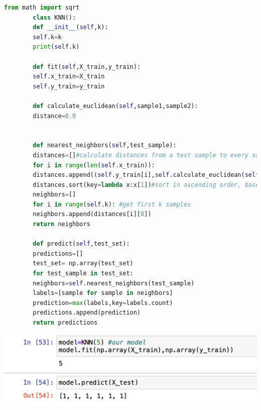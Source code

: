 \documentclass{article}
\begin{document}
	\begin{lstlisting}[language=Python]
		from math import sqrt
		class KNN():
		def __init__(self,k):
		self.k=k
		print(self.k)
		
		def fit(self,X_train,y_train):
		self.x_train=X_train
		self.y_train=y_train
		
		def calculate_euclidean(self,sample1,sample2):
		distance=0.0
	
		
		def nearest_neighbors(self,test_sample):
		distances=[]#calculate distances from a test sample to every sample in a training set
		for i in range(len(self.x_train)):
		distances.append((self.y_train[i],self.calculate_euclidean(self.x_train[i],test_sample)))
		distances.sort(key=lambda x:x[1])#sort in ascending order, based on a distance value
		neighbors=[]
		for i in range(self.k): #get first k samples
		neighbors.append(distances[i][0])
		return neighbors
		
		def predict(self,test_set):
		predictions=[]
		test_set= np.array(test_set)
		for test_sample in test_set:
		neighbors=self.nearest_neighbors(test_sample)
		labels=[sample for sample in neighbors]
		prediction=max(labels,key=labels.count)
		predictions.append(prediction)
		return predictions
	\end{lstlisting}
	\includegraphics[scale=0.8]{images/5.png}
\end{document}
